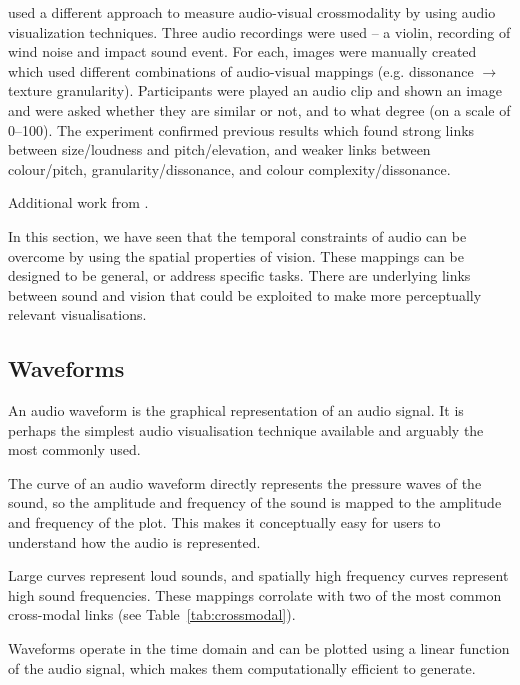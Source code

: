 \citet{Tsiros2014} used a different approach to measure audio-visual crossmodality by using audio visualization
techniques.  Three audio recordings were used -- a violin, recording of wind noise and impact sound event. For each,
images were manually created which used different combinations of audio-visual mappings (e.g. dissonance $\to$ texture
granularity). Participants were played an audio clip and shown an image and were asked whether they are similar or not,
and to what degree (on a scale of 0--100).  The experiment confirmed previous results which found strong links between
size/loudness and pitch/elevation, and weaker links between colour/pitch, granularity/dissonance, and colour
complexity/dissonance.

Additional work from \citet{Marks2003}.


In this section, we have seen that the temporal constraints of audio can be overcome by using the spatial properties of
vision. These mappings can be designed to be general, or address specific tasks. There are underlying links between
sound and vision that could be exploited to make more perceptually relevant visualisations.

\subsection{Waveforms}

An audio waveform is the graphical representation of an audio signal. It is perhaps the simplest audio visualisation
technique available and arguably the most commonly used.


The curve of an audio waveform directly represents the pressure waves of the sound, so the amplitude and frequency of
the sound is mapped to the amplitude and frequency of the plot. This makes it conceptually easy for users to
understand how the audio is represented.

Large curves represent loud sounds, and spatially high frequency curves represent high sound frequencies. These
mappings corrolate with two of the most common cross-modal links (see Table~\ref{tab:crossmodal}).

Waveforms operate in the time domain and can be plotted using a linear function of the audio signal, which makes them
computationally efficient to generate. 

